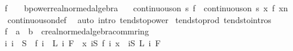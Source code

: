 \begin{isabellebody}
\ \ \ f\ {\isacharcolon}{\kern0pt}{\isacharcolon}{\kern0pt}\ {\isachardoublequoteopen}{\isacharunderscore}{\kern0pt}\ {\isasymRightarrow}\ {\isacharprime}{\kern0pt}b{\isacharcolon}{\kern0pt}{\isacharcolon}{\kern0pt}{\isacharbraceleft}{\kern0pt}power{\isacharcomma}{\kern0pt}real{\isacharunderscore}{\kern0pt}normed{\isacharunderscore}{\kern0pt}algebra{\isacharbraceright}{\kern0pt}{\isachardoublequoteclose}\isanewline
\ \ \ {\isachardoublequoteopen}continuous{\isacharunderscore}{\kern0pt}on\ s\ f\ {\isasymLongrightarrow}\ continuous{\isacharunderscore}{\kern0pt}on\ s\ {\isacharparenleft}{\kern0pt}{\isasymlambda}x{\isachardot}{\kern0pt}\ {\isacharparenleft}{\kern0pt}f\ x{\isacharparenright}{\kern0pt}{\isacharcircum}{\kern0pt}n{\isacharparenright}{\kern0pt}{\isachardoublequoteclose}\isanewline
%
\isadelimproof
\ \ %
\endisadelimproof
%
\isatagproof
{}\isamarkupfalse%
\ continuous{\isacharunderscore}{\kern0pt}on{\isacharunderscore}{\kern0pt}def\ \isamarkupfalse%
\ {\isacharparenleft}{\kern0pt}auto\ intro{\isacharcolon}{\kern0pt}\ tendsto{\isacharunderscore}{\kern0pt}power{\isacharparenright}{\kern0pt}%
\endisatagproof
{\isafoldproof}%
%
\isadelimproof
\isanewline
%
\endisadelimproof
\isanewline
{}\isamarkupfalse%
\ tendsto{\isacharunderscore}{\kern0pt}prod\ {\isacharbrackleft}{\kern0pt}tendsto{\isacharunderscore}{\kern0pt}intros{\isacharbrackright}{\kern0pt}{\isacharcolon}{\kern0pt}\isanewline
\ \ \ f\ {\isacharcolon}{\kern0pt}{\isacharcolon}{\kern0pt}\ {\isachardoublequoteopen}{\isacharprime}{\kern0pt}a\ {\isasymRightarrow}\ {\isacharprime}{\kern0pt}b\ {\isasymRightarrow}\ {\isacharprime}{\kern0pt}c{\isacharcolon}{\kern0pt}{\isacharcolon}{\kern0pt}{\isacharbraceleft}{\kern0pt}real{\isacharunderscore}{\kern0pt}normed{\isacharunderscore}{\kern0pt}algebra{\isacharcomma}{\kern0pt}comm{\isacharunderscore}{\kern0pt}ring{\isacharunderscore}{\kern0pt}{}{\isacharbraceright}{\kern0pt}{\isachardoublequoteclose}\isanewline
\ \ \ {\isachardoublequoteopen}{\isacharparenleft}{\kern0pt}{\isasymAnd}i{\isachardot}{\kern0pt}\ i\ {\isasymin}\ S\ {\isasymLongrightarrow}\ {\isacharparenleft}{\kern0pt}f\ i\ {\isasymlonglongrightarrow}\ L\ i{\isacharparenright}{\kern0pt}\ F{\isacharparenright}{\kern0pt}\ {\isasymLongrightarrow}\ {\isacharparenleft}{\kern0pt}{\isacharparenleft}{\kern0pt}{\isasymlambda}x{\isachardot}{\kern0pt}\ {\isasymProd}i{\isasymin}S{\isachardot}{\kern0pt}\ f\ i\ x{\isacharparenright}{\kern0pt}\ {\isasymlonglongrightarrow}\ {\isacharparenleft}{\kern0pt}{\isasymProd}i{\isasymin}S{\isachardot}{\kern0pt}\ L\ i{\isacharparenright}{\kern0pt}{\isacharparenright}{\kern0pt}\ F{\isachardoublequoteclose}\isanewline

\end{isabellebody}

